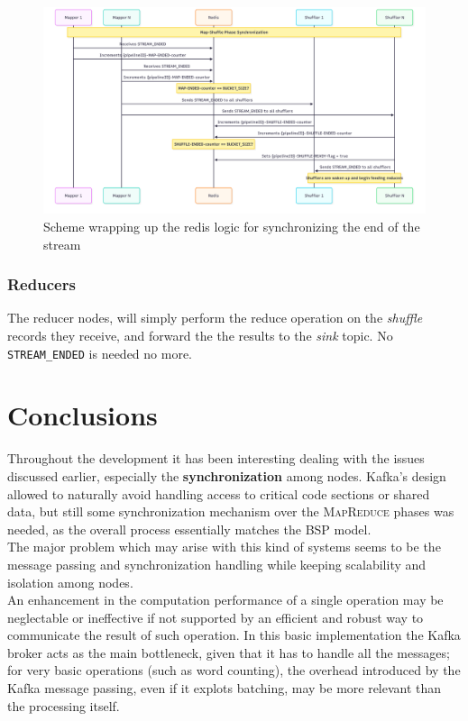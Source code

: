 \newpage
\begin{figure}[htbp]
   \centering
   \includegraphics[width=\columnwidth]{images/redisSynch.png}
   \caption{Scheme wrapping up the redis logic for synchronizing the end of the stream}
   \label{fig:redisSynch}
\end{figure}

\subsubsection{Reducers}
The reducer nodes, will simply perform the reduce operation on the \textit{shuffle} records they receive, and forward the the results to the \textit{sink} topic.
No \lstinline|STREAM_ENDED| is needed no more.


\section{Conclusions}

Throughout the development it has been interesting dealing with the issues discussed earlier, especially the \textbf{synchronization} among nodes. Kafka's design allowed to naturally avoid handling access to critical code sections or shared data, but still some synchronization mechanism over the \textsc{MapReduce} phases was needed, as the overall process essentially matches the \textsc{BSP} model.\\
The major problem which may arise with this kind of systems seems to be the message passing and synchronization handling while keeping scalability and isolation among nodes.\\
An enhancement in the computation performance of a single operation may be neglectable or ineffective if not supported by an efficient and robust way to communicate the result of such operation.
In this basic implementation the Kafka broker acts as the main bottleneck, given that it has to handle all the messages; for very basic operations (such as word counting), the overhead introduced by the Kafka message passing, even if it explots batching, may be more relevant than the processing itself.

